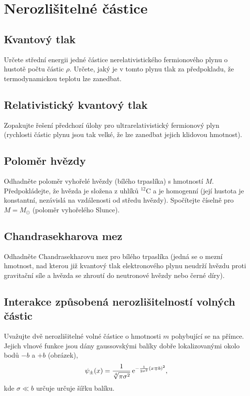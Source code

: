 \section{Nerozlišitelné částice}
    \subsection{Kvantový tlak}
        Určete střední energii jedné částice nerelativistického fermionového plynu o hustotě počtu částic $\rho$.
        Určete, jaký je v tomto plynu tlak za předpokladu, že termodynamickou teplotu lze zanedbat.

    \subsection{Relativistický kvantový tlak}
        Zopakujte řešení předchozí úlohy pro ultrarelativistický fermionový plyn (rychlosti částic plynu jsou tak velké, že lze zanedbat jejich klidovou hmotnost).

    \subsection{Poloměr hvězdy}
        Odhadněte poloměr vyhořelé hvězdy (bílého trpaslíka) s hmotností $M$.
        Předpokládejte, že hvězda je složena z uhlíků $^{12}$C a je homogenní (její hustota je konstantní, nezávislá na vzdálenosti od středu hvězdy).
        Spočítejte číselně pro $M=M_{\odot}$ (poloměr vyhořelého Slunce).

    \subsection{Chandrasekharova mez}
        Odhadněte Chandrasekharovu mez pro bílého trpaslíka (jedná se o mezní hmotnost, nad kterou již kvantový tlak elektronového plynu neudrží hvězdu proti gravitační síle a hvězda se zhroutí do neutronové hvězdy nebo černé díry).

    \subsection{Interakce způsobená nerozlišitelností volných částic}
        Uvažujte dvě nerozlišitelné volné částice o hmotnosti $m$ pohybující se na přímce.
        Jejich vlnové funkce jsou dány gaussovskými balíky dobře lokalizovanými okolo bodů $-b$ a $+b$ (obrázek),
        \begin{equation}
            \psi_{\pm}(x)=\frac{1}{\sqrt[4]{\pi\sigma^{2}}}\operatorname{e}^{-\frac{1}{2\sigma^{2}}(x\mp b)^{2}},
        \end{equation}
        kde $\sigma\ll b$ určuje určuje šířku balíku.
        
